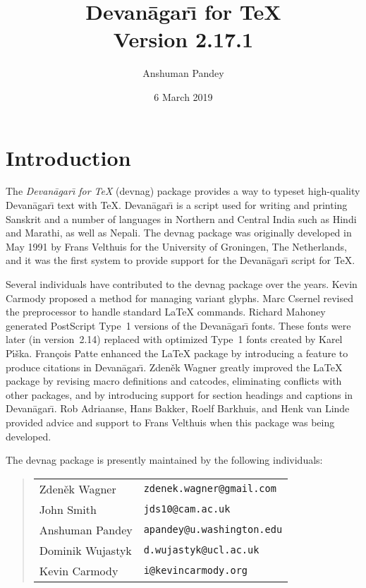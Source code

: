 \documentclass[10pt]{article}
\newcommand{\moddate}{6 March 2019}
\newcommand{\version}{2.17.1}
\newcommand{\devnag}{Devan\=agar{\=\i}}
\begin{document}
\pagestyle{fancy}
\fancyhf{}
\fancyfoot[C]{\thepage}

\fontsize{10}{13}\selectfont

\title{{\LARGE \bfseries \devnag{} for \TeX{}} \\ Version \version{}}
\author{Anshuman Pandey}
\date{\large \moddate{}}
\maketitle

\tableofcontents

\listoftables

\section{Introduction}

The \textit{\devnag{} for \TeX{}} (\textsf{devnag}) package provides a
way to typeset high-quality \devnag{} text with \TeX{}.
\devnag{} is a script used for writing and printing Sanskrit and
a number of languages in Northern and Central India such as Hindi and
Marathi, as well as Nepali. The \textsf{devnag} package was originally
developed in May 1991 by Frans Velthuis for the University of Groningen,
The Netherlands, and it was the first system to provide support for
the \devnag{} script for \TeX{}.

Several individuals have contributed to the \textsf{devnag} package
over the years. Kevin Carmody proposed a method for managing variant
glyphs. Marc Csernel revised the preprocessor to handle standard
\LaTeX{} commands. Richard Mahoney generated PostScript Type~1
versions of the \devnag{} fonts. These fonts were later (in version~2.14) replaced with optimized 
Type~1 fonts created by Karel P\'{\i}\v{s}ka. Fran\c{c}ois Patte enhanced the \LaTeX{} package by 
introducing
a feature to produce citations in \devnag{}. Zden\v{e}k Wagner greatly improved the \LaTeX{}
package by revising macro definitions and catcodes, eliminating
conflicts with other packages, and by introducing support for
section headings and captions in \devnag{}. Rob Adriaanse, Hans Bakker,
Roelf Barkhuis, and Henk van Linde provided advice and support
to Frans Velthuis when this package was being developed.

The \textsf{devnag} package is presently maintained by the following
individuals:

\begin{quote}
\begin{tabular}{ll}
Zden\v{e}k Wagner  & \verb+zdenek.wagner@gmail.com+ \\
John Smith         & \verb+jds10@cam.ac.uk+ \\
Anshuman Pandey    & \verb+apandey@u.washington.edu+ \\
Dominik Wujastyk   & \verb+d.wujastyk@ucl.ac.uk+ \\
Kevin Carmody      & \verb+i@kevincarmody.org+
\end{tabular}
\end{quote}
\end{document}
